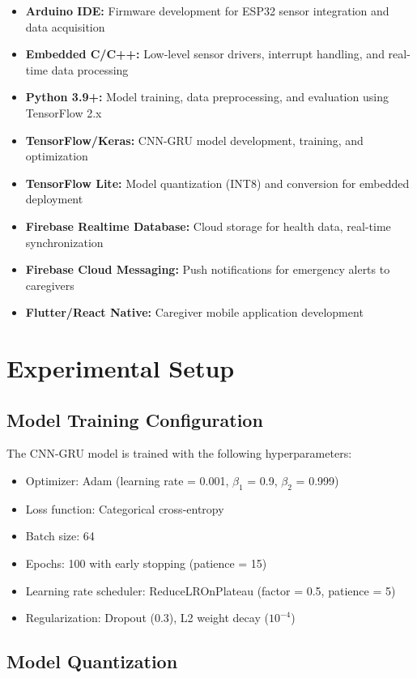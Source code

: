 \documentclass[conference]{IEEEtran}
\begin{document}
\begin{itemize}
    \item \textbf{Arduino IDE:} Firmware development for ESP32 sensor integration and data acquisition
    \item \textbf{Embedded C/C++:} Low-level sensor drivers, interrupt handling, and real-time data processing
    \item \textbf{Python 3.9+:} Model training, data preprocessing, and evaluation using TensorFlow 2.x
    \item \textbf{TensorFlow/Keras:} CNN-GRU model development, training, and optimization
    \item \textbf{TensorFlow Lite:} Model quantization (INT8) and conversion for embedded deployment
    \item \textbf{Firebase Realtime Database:} Cloud storage for health data, real-time synchronization
    \item \textbf{Firebase Cloud Messaging:} Push notifications for emergency alerts to caregivers
    \item \textbf{Flutter/React Native:} Caregiver mobile application development
\end{itemize}

\section{Experimental Setup}

\subsection{Model Training Configuration}

The CNN-GRU model is trained with the following hyperparameters:
\begin{itemize}
    \item Optimizer: Adam (learning rate = 0.001, $\beta_1$ = 0.9, $\beta_2$ = 0.999)
    \item Loss function: Categorical cross-entropy
    \item Batch size: 64
    \item Epochs: 100 with early stopping (patience = 15)
    \item Learning rate scheduler: ReduceLROnPlateau (factor = 0.5, patience = 5)
    \item Regularization: Dropout (0.3), L2 weight decay ($10^{-4}$)
\end{itemize}

\subsection{Model Quantization}
\end{document}
